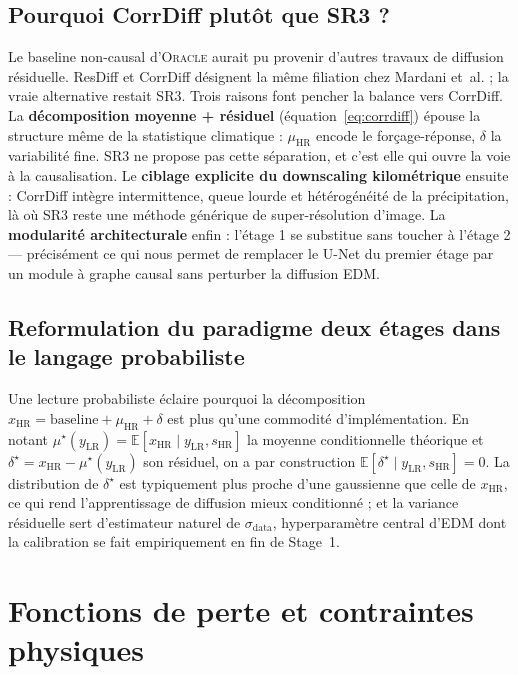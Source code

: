 \documentclass[14pt,a4paper,openany]{extreport}
\newcommand{\Oracle}{\textsc{Oracle}}
\newcommand{\LR}{\ensuremath{\text{LR}}}
\newcommand{\HR}{\ensuremath{\text{HR}}}
\newcommand{\xHR}{\ensuremath{x_{\HR}}}
\newcommand{\yLR}{\ensuremath{y_{\LR}}}
\newcommand{\muHR}{\ensuremath{\mu_{\HR}}}
\begin{document}
\subsection{Pourquoi CorrDiff plutôt que SR3 ?}
\label{ssec:soa-corrdiff-choix}

Le baseline non-causal d'\Oracle{} aurait pu provenir d'autres travaux de diffusion résiduelle. ResDiff et CorrDiff désignent la même filiation chez Mardani et~al. ; la vraie alternative restait SR3. Trois raisons font pencher la balance vers CorrDiff. La \textbf{décomposition moyenne + résiduel} (équation~\ref{eq:corrdiff}) épouse la structure même de la statistique climatique : $\muHR$ encode le forçage-réponse, $\delta$ la variabilité fine. SR3 ne propose pas cette séparation, et c'est elle qui ouvre la voie à la causalisation. Le \textbf{ciblage explicite du downscaling kilométrique} ensuite : CorrDiff intègre intermittence, queue lourde et hétérogénéité de la précipitation, là où SR3 reste une méthode générique de super-résolution d'image. La \textbf{modularité architecturale} enfin : l'étage 1 se substitue sans toucher à l'étage 2 --- précisément ce qui nous permet de remplacer le U-Net du premier étage par un module à graphe causal sans perturber la diffusion EDM.

\subsection{Reformulation du paradigme deux étages dans le langage probabiliste}
\label{ssec:soa-corrdiff-reform}

Une lecture probabiliste éclaire pourquoi la décomposition $\xHR = \mathrm{baseline} + \muHR + \delta$ est plus qu'une commodité d'implémentation. En notant $\mu^{\star}(\yLR) = \mathbb{E}[\xHR \mid \yLR, s_{\HR}]$ la moyenne conditionnelle théorique et $\delta^{\star} = \xHR - \mu^{\star}(\yLR)$ son résiduel, on a par construction $\mathbb{E}[\delta^{\star} \mid \yLR, s_{\HR}] = 0$. La distribution de $\delta^{\star}$ est typiquement plus proche d'une gaussienne que celle de $\xHR$, ce qui rend l'apprentissage de diffusion mieux conditionné ; et la variance résiduelle sert d'estimateur naturel de $\sigma_{\mathrm{data}}$, hyperparamètre central d'EDM dont la calibration se fait empiriquement en fin de Stage~1.

\section{Fonctions de perte et contraintes physiques}
\label{sec:soa-pertes}
\end{document}
